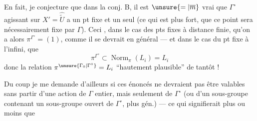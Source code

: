 En fait, je conjecture que dans la conj. B, il est $\unsure{=|\overline m}$ vrai que $\Gamma^\circ$ agissant sur $X'=\widehat{\widetilde U}$ a un pt fixe et un seul (ce qui est plus fort, que ce point  sera nécessairement fixe par $\Gamma$). Ceci , dans le cas des pts fixes à distance finie, qu'on a alors $\pi^{\Gamma^\circ}=(1)$, comme il se devrait en général --- et dans le cas du pt fixe à l'infini, que
\[
\pi^{\Gamma^\circ}\subset\operatorname{Norm}_{\pi}(L_i)=L_i
\]
donc la relation $\pi^{\unsure{\Gamma_0|\Gamma^\circ}}=L_i$ ``hautement plausible'' de tantôt !

Du coup je me demande d'ailleurs si ces énoncés ne devraient pas être valables sans partir d'une action de $\Gamma$  entier, mais seulement de $\Gamma^\circ$ (ou d'un sous-groupe contenant un sous-groupe ouvert de $\Gamma^\circ$, plus gén.) --- ce qui signifierait plus ou moins que
